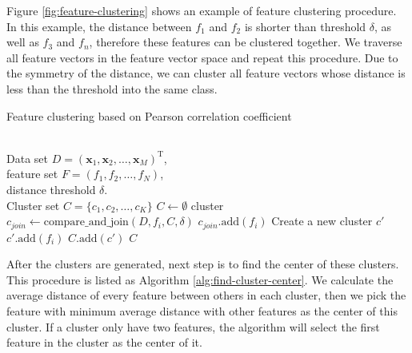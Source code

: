 \documentclass{ieeeaccess}
\theoremstyle{definition}
\begin{document}
Figure \ref{fig:feature-clustering} shows an example of feature clustering procedure. In this example, the distance between $f_1$ and $f_2$ is shorter than threshold $\delta$, as well as $f_3$ and $f_n$, therefore these features can be clustered together. We traverse all feature vectors in the feature vector space and repeat this procedure. Due to the symmetry of the distance, we can cluster all feature vectors whose distance is less than the threshold into the same class. 

\begin{algorithm}
    \caption{Feature clustering based on Pearson correlation coefficient}
    \label{alg:clustering}
    \begin{algorithmic}[1]
    \REQUIRE ~~\\
        Data set $D=(\bm{x}_1,\bm{x}_2,\ldots,\bm{x}_M)^\text{T}$, \\
        feature set $F=(f_1,f_2,\ldots,f_N)$, \\
        distance threshold $\delta$.
    \ENSURE ~~\\
        Cluster set $C=\{c_1,c_2,\ldots,c_K\}$
    \STATE $C \gets \emptyset$
            \STATE cluster $c_{join} \gets \text{compare\_and\_join}(D, f_i, C, \delta)$
                \STATE $c_{join}\text{.add}(f_i)$
            \ELSE
                \STATE Create a new cluster $c'$
                \STATE $c'\text{.add}(f_i)$
                \STATE $C\text{.add}(c')$
            \ENDIF
        \ENDIF
    \ENDFOR
    \RETURN $C$
    \end{algorithmic}
    \end{algorithm}

    After the clusters are generated, next step is to find the center of these clusters. This procedure is listed as Algorithm \ref{alg:find-cluster-center}. We calculate the average distance of every feature between others in each cluster, then we pick the feature with minimum average distance with other features as the center of this cluster. If a cluster only have two features, the algorithm will select the first feature in the cluster as the center of it.
    
\end{document}
